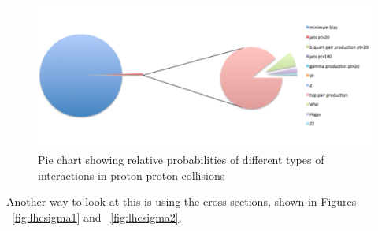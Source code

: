 \begin{figure}[h]
\centering\includegraphics[scale=0.5]{./protonprotoncollisions/Pictures/fig3.pdf}
\caption{Pie chart showing relative probabilities of different types of interactions in proton-proton collisions}
\label{fig:productionprobs}
\end{figure}
Another way to look at this is using the cross sections, shown in Figures ~\ref{fig:lhcsigma1} and  ~\ref{fig:lhcsigma2}.

